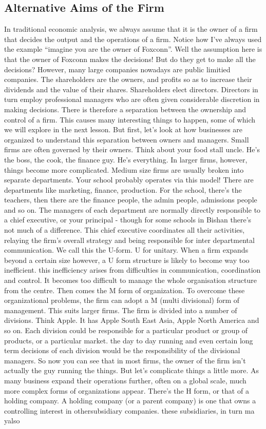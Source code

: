 \documentclass[DIV=classic,11pt,numbers=noenddot,listof=totoc,bibliography=totoc,parskip]{scrartcl}
\begin{document}
\subsection{Alternative Aims of the Firm}
 In traditional economic analysis, we always assume that it is the owner of a firm that decides the output and the operations of a firm. Notice how I’ve always used the example “imagine you are the owner of Foxconn”. Well the assumption here is that the owner of Foxconn makes the decisions! But do they get to make all the decisions? However, many large companies nowadays are public limitied companies. The shareholders are the owners, and profits so as to increase their dividends and the value of their shares. Shareholders elect directors. Directors in turn employ professional managers who are often given considerable discretion in making decisions. There is therefore a separation between the ownership and control of a firm. This causes many interesting things to happen, some of which we will explore in the next lesson. But first, let’s look at how businesses are organized to understand this separation between owners and managers. Small firms are often governed by their owners. Think about your food stall uncle. He’s the boss, the cook, the finance guy. He’s everything. In larger firms, however, things become more complicated. Medium size firms are usually broken into separate departments. Your school probably operates via this model! There are departments like marketing, finance, production. For the school, there’s the teachers, then there are the finance people, the admin people, admissions people and so on. The managers of each department are normally directly responsible to a chief executive, or your principal - though for some schools in Bishan there’s not much of a difference. This chief executive coordinates all their activities, relaying the firm’s overall strategy and being responsible for inter departmental communication. We call this the U-form. U for unitary. When a firm expands beyond a certain size however, a U form structure is likely to become way too inefficient. this inefficiency arises from difficulties in communication, coordination and control. It becomes too difficult to manage the whole organisation structure from the centre. Then comes the M form of organization. To overcome these organizational problems, the firm can adopt a M (multi divisional) form of management. This suits larger firms. The firm is divided into a number of divisions. Think Apple. It has Apple South East Asia, Apple North America and so on. Each division could be responsible for a particular product or group of products, or a particular market. the day to day running and even certain long term decisions of each division would be the responsibility of the divisional managers. So now you can see that in most firms, the owner of the firm isn’t actually the guy running the things. But let’s complicate things a little more. As many business expand their operations further, often on a global scale, much more complex forms of organizations appear. There’s the H form, or that of a holding company. A holding company (or a parent company) is one that owns a controlling interest in othersubsidiary companies. these subsidiaries, in turn ma yalso 
\end{document}
